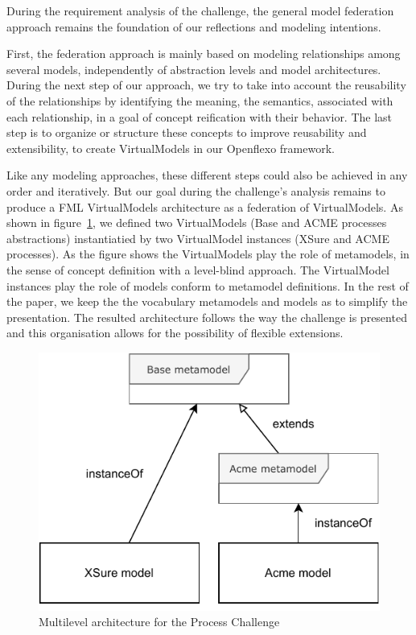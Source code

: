 
During the requirement analysis of the challenge, the general model federation approach remains the foundation of our reflections and modeling intentions. 

First, the federation approach is mainly based on modeling relationships among several models, independently of abstraction levels and model architectures.
During the next step of our approach, we try to take into account the reusability of the relationships by identifying the meaning, the semantics, associated with each relationship, in a goal of concept reification with their behavior. The last step is to organize or structure these concepts to improve reusability and extensibility, to create VirtualModels in our Openflexo framework.     

Like any modeling approaches, these different steps could also be achieved in any order and iteratively. But our goal during the challenge's analysis remains to produce a FML VirtualModels architecture as a federation of VirtualModels. 
As shown in figure~\ref{fig:MultilevelArchitecture}, we defined two VirtualModels (Base and ACME processes abstractions) instantiatied by two VirtualModel instances (XSure and ACME processes). As the figure shows the VirtualModels play the role of metamodels, in the sense of concept definition with a level-blind approach. The VirtualModel instances play the role of models conform to metamodel definitions. In the rest of the paper, we keep the the vocabulary metamodels and models as to simplify the presentation.
The resulted architecture follows the way the challenge is presented and this organisation allows for the possibility of flexible extensions.

\begin{figure}
    \centering
    \includegraphics[width=0.7 \columnwidth]{Figures/MultilevelArchitecture.pdf}
    \caption{Multilevel architecture for the Process Challenge}
    \label{fig:MultilevelArchitecture}
\end{figure}


